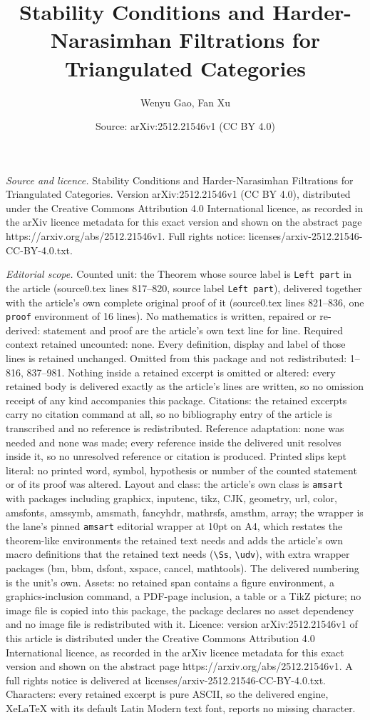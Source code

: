 \documentclass[10pt,a4paper]{amsart}
\title[Stability Conditions and Harder-Narasimhan Filtrations for T]{Stability Conditions and Harder-Narasimhan Filtrations for Triangulated Categories}
\author{Wenyu Gao, Fan Xu}
\date{Source: arXiv:2512.21546v1 (CC BY 4.0)}
\begin{document}
\maketitle

\noindent\emph{Source and licence.} Stability Conditions and Harder-Narasimhan Filtrations for Triangulated Categories. Version arXiv:2512.21546v1 (CC BY 4.0), distributed under the Creative Commons Attribution 4.0 International licence, as recorded in the arXiv licence metadata for this exact version and shown on the abstract page https://arxiv.org/abs/2512.21546v1. Full rights notice: licenses/arxiv-2512.21546-CC-BY-4.0.txt.\par\smallskip

\noindent\textit{Editorial scope.} Counted unit: the Theorem whose source label is \texttt{Left part} in the article (source0.tex lines 817--820, source label \texttt{Left part}), delivered together with the article's own complete original proof of it (source0.tex lines 821--836, one \texttt{proof} environment of 16 lines). No mathematics is written, repaired or re-derived: statement and proof are the article's own text line for line. Required context retained uncounted: none. Every definition, display and label of those lines is retained unchanged. Omitted from this package and not redistributed: 1--816, 837--981. Nothing inside a retained excerpt is omitted or altered: every retained body is delivered exactly as the article's lines are written, so no omission receipt of any kind accompanies this package. Citations: the retained excerpts carry no citation command at all, so no bibliography entry of the article is transcribed and no reference is redistributed. Reference adaptation: none was needed and none was made; every reference inside the delivered unit resolves inside it, so no unresolved reference or citation is produced. Printed slips kept literal: no printed word, symbol, hypothesis or number of the counted statement or of its proof was altered. Layout and class: the article's own class is \texttt{amsart} with packages including graphicx, inputenc, tikz, CJK, geometry, url, color, amsfonts, amssymb, amsmath, fancyhdr, mathrsfs, amsthm, array; the wrapper is the lane's pinned \texttt{amsart} editorial wrapper at 10pt on A4, which restates the theorem-like environments the retained text needs and adds the article's own macro definitions that the retained text needs (\texttt{\textbackslash Ss}, \texttt{\textbackslash udv}), with extra wrapper packages (bm, bbm, dsfont, xspace, cancel, mathtools). The delivered numbering is the unit's own. Assets: no retained span contains a figure environment, a graphics-inclusion command, a PDF-page inclusion, a table or a TikZ picture; no image file is copied into this package, the package declares no asset dependency and no image file is redistributed with it. Licence: version arXiv:2512.21546v1 of this article is distributed under the Creative Commons Attribution 4.0 International licence, as recorded in the arXiv licence metadata for this exact version and shown on the abstract page https://arxiv.org/abs/2512.21546v1. A full rights notice is delivered at licenses/arxiv-2512.21546-CC-BY-4.0.txt. Characters: every retained excerpt is pure ASCII, so the delivered engine, XeLaTeX with its default Latin Modern text font, reports no missing character.
\end{document}
